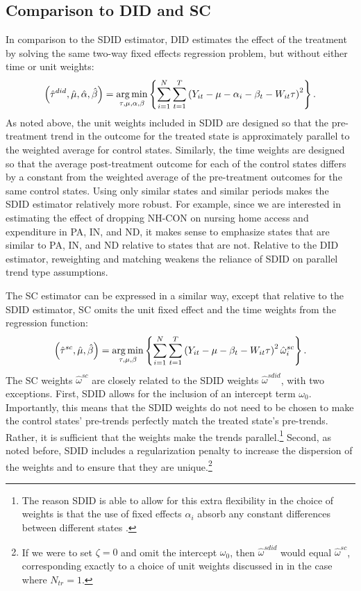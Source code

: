 \documentclass[../Main.tex]{subfiles}
\begin{document}
\subsection{Comparison to DID and SC} \label{did_sc_comp}

In comparison to the SDID estimator, DID estimates the effect of the treatment by solving the same two-way fixed effects regression problem, but without either time or unit weights:
\begin{equation} \label{eq:did_reg}
    \left(\hat{\tau}^{did},\hat{\mu},\hat{\alpha},\hat{\beta}\right)=\operatorname*{arg\,min}_{\tau,\mu,\alpha,\beta}\left\{\sum_{i=1}^N\sum_{t=1}^T\left(Y_{it}-\mu-\alpha_i-\beta_t-W_{it}\tau\right)^2\right\}.
\end{equation}
As noted above, the unit weights included in SDID are designed so that the pre-treatment trend in the outcome for the treated state is approximately parallel to the weighted average for control states. Similarly, the time weights are designed so that the average post-treatment outcome for each of the control states differs by a constant from the weighted average of the pre-treatment outcomes for the same control states. Using only similar states and similar periods makes the SDID estimator relatively more robust. For example, since we are interested in estimating the effect of dropping NH-CON on nursing home access and expenditure in PA, IN, and ND, it makes sense to emphasize states that are similar to PA, IN, and ND relative to states that are not. Relative to the DID estimator, reweighting and matching weakens the reliance of SDID on parallel trend type assumptions.

The SC estimator can be expressed in a similar way, except that relative to the SDID estimator, SC omits the unit fixed effect and the time weights from the regression function:
\begin{equation} \label{eq:sc_reg}
    \left(\hat{\tau}^{sc},\hat{\mu},\hat{\beta}\right)=\operatorname*{arg\,min}_{\tau,\mu,\beta}\left\{\sum_{i=1}^N\sum_{t=1}^T\left(Y_{it}-\mu-\beta_t-W_{it}\tau\right)^2\hat{\omega}_i^{sc}\right\}.
\end{equation}
The SC weights $\hat{\omega}^{sc}$ are closely related to the SDID weights $\hat{\omega}^{sdid}$, with two exceptions. First, SDID allows for the inclusion of an intercept term $\omega_0$. Importantly, this means that the SDID weights do not need to be chosen to make the control states' pre-trends perfectly match the treated state's pre-trends. Rather, it is sufficient that the weights make the trends parallel.\footnote{The reason SDID is able to allow for this extra flexibility in the choice of weights is that the use of fixed effects $\alpha_i$ absorb any constant differences between different states \citep{arkhangelsky2021synthetic}.} Second, as noted before, SDID includes a regularization penalty to increase the dispersion of the weights and to ensure that they are unique.\footnote{If we were to set $\zeta=0$ and omit the intercept $\omega_0$, then $\hat{\omega}^{sdid}$ would equal $\hat{\omega}^{sc}$, corresponding exactly to a choice of unit weights discussed in \citet{abadie2010synthetic} in the case where $N_{tr}=1$.}
\end{document}
